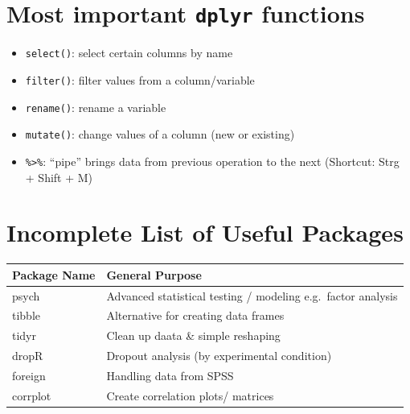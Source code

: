 \documentclass[
]{book}
\providecommand{\tightlist}{%
  \setlength{\itemsep}{0pt}\setlength{\parskip}{0pt}}
\begin{document}
\section*{\texorpdfstring{Most important \texttt{dplyr} functions}{Most important dplyr functions}}\label{mif}

\begin{itemize}
\tightlist
\item
  \texttt{select()}: select certain columns by name
\item
  \texttt{filter()}: filter values from a column/variable
\item
  \texttt{rename()}: rename a variable
\item
  \texttt{mutate()}: change values of a column (new or existing)
\item
  \texttt{\%\textgreater{}\%}: ``pipe'' brings data from previous operation to the next (Shortcut: Strg + Shift + M)
\end{itemize}

\section*{Incomplete List of Useful Packages}\label{lop}

\begin{longtable}[]{@{}ll@{}}
\toprule\noalign{}
Package Name & General Purpose \\
\midrule\noalign{}
\endhead
\bottomrule\noalign{}
\endlastfoot
psych & Advanced statistical testing / modeling e.g.~factor analysis \\
tibble & Alternative for creating data frames \\
tidyr & Clean up daata \& simple reshaping \\
dropR & Dropout analysis (by experimental condition) \\
foreign & Handling data from SPSS \\
corrplot & Create correlation plots/ matrices \\
\end{longtable}

  
\end{document}
